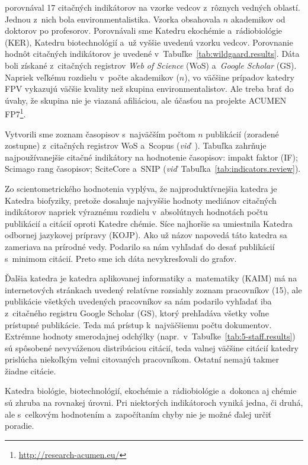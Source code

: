 \citet{Wildgaard2015} porovnával 17 citačných indikátorov na vzorke vedcov
z~rôznych vedných oblastí.  Jednou z~nich bola environmentalistika.  Vzorka
obsahovala $n$ akademikov od doktorov po profesorov.  Porovnávali sme Katedru
ekochémie a~rádiobiológie (KER), Katedru biotechnológií a~už vyššie uvedenú
vzorku vedcov.  Porovnanie hodnôt citačných indikátorov je uvedené
v~Tabuľke~\ref{tab:wildgaard.results}.  Dáta boli získané z~citačných registrov
\emph{Web of Science} (WoS) a~\emph{Google Scholar} (GS).  Napriek veľkému
rozdielu v~počte akademikov ($n$), vo väčšine prípadov katedry FPV vykazujú
väčšie kvality než skupina environmentalistov.  Ale treba brať do úvahy, že
skupina nie je viazaná afiliáciou, ale účasťou na projekte ACUMEN
FP7\footnote{\url{http://research-acumen.eu/}}.

Vytvorili sme zoznam časopisov s~najväčším počtom $n$ publikácií (zoradené
zostupne) z~citačných registrov WoS a~Scopus
(\emph{viď}~).  Tabuľka zahrňuje najpoužívanejšie citačné
indikátory na hodnotenie časopisov: impakt faktor (IF); Scimago rang časopisov;
SciteCore a~SNIP (\emph{viď}~Tabuľka~\ref{tab:indicators.review}).

Zo scientometrického hodnotenia vyplýva, že najproduktívnejšia katedra je
Katedra biofyziky, pretože dosahuje najvyššie hodnoty mediánov citačných
indikátorov napriek výraznému rozdielu v~absolútnych hodnotách počtu publikácií
a citácií oproti Katedre chémie.  Síce najhoršie sa umiestnila Katedra odbornej
jazykovej prípravy (KOJP).  Ako už názov napovedá táto katedra sa zameriava na
prírodné vedy.  Podarilo sa nám vyhľadať do desať publikácií s~minimom citácií.
Preto sme ich dáta nevykresľovali do grafov.

Ďalšia katedra je katedra aplikovanej informatiky a~matematiky (KAIM) má na
internetových stránkach uvedený relatívne rozsiahly zoznam pracovníkov (15), ale
publikácie všetkých uvedených pracovníkov sa nám podarilo vyhľadať iba
z~citačného registru Google Scholar (GS), ktorý prehľadáva všetky voľne
prístupné publikácie.  Teda má prístup k~najväčšiemu počtu dokumentov.  Extrémne
hodnoty smerodajnej odchýlky (napr.~v~Tabuľke~\ref{tab:5-staff.results}) sú
spôsobené nevyváženou distribúciou citácií, teda valnej väčšine citácií katedry
prislúcha niekoľkým veľmi citovaných pracovníkom.  Ostatní nemajú takmer žiadne
citácie.

Katedra biológie, biotechnológií, ekochémie a~rádiobiológie a~dokonca aj chémie
sú zhruba na rovnakej úrovni.  Pri niektorých indikátoroch vyniká jedna, či
druhá, ale s~celkovým hodnotením a~započítaním chyby nie je možné ďalej určiť
poradie.

